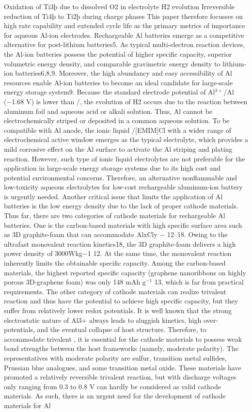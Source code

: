 Oxidation of Ti3þ due to dissolved O2 in electrolyte
H2 evolution
Irreversible reduction of Ti4þ to Ti2þ during charge phases 
This paper therefore focusses on high rate capability and extended cycle life as the primary metrics of importance for aqueous Al-ion electrodes.
Rechargeable Al batteries emerge as a competitive alternative for post-lithium batteries5. As typical multi-electron reaction devices, the Al-ion batteries possess the potential of higher specific capacity, superior volumetric energy density, and comparable gravimetric energy density to lithium-ion batteries6,8,9. Moreover, the high abundancy and easy accessibility of Al resources enable Al-ion batteries to become an ideal candidate for large-scale energy storage system9. Because the standard electrode potential of Al$^{3+}$/Al (−1.68 V) is lower than /, the evolution of H2 occurs due to the reaction between aluminum foil and aqueous acid or alkali solution. Thus, Al cannot be electrochemically striped or deposited
in a common aqueous solution. To be compatible with Al anode, the ionic liquid /[EMIM]Cl with a wider range of electrochemical active window emerges as the typical electrolyte, which provides a mild corrosive effect on the Al surface to activate the Al striping and plating reaction. However, such type of ionic liquid electrolytes are not preferable for the application in large-scale energy storage systems due to its high cost and potential environmental concerns. Therefore, an alternative nonflammable and low-toxicity aqueous electrolytes for low-cost rechargeable aluminum-ion battery is urgently needed. Another critical issue that limits the application of Al batteries is the low energy density due to the lack of proper cathode materials. Thus far, there are two categories of cathode materials for rechargeable Al batteries. One is the carbon-based materials with high specific surface area such as 3D graphite-foam that can accommodate AlxCly − 12–18. Owing to the ultrafast monovalent reaction kinetics18, the 3D graphite-foam delivers a high power density of 3000Wkg−1 12. At the same time, the monovalent reaction inherently limits the obtainable specific capacity. Among the carbon-based materials, the highest reported specific capacity (graphene nanoribbons on highly porous 3D-graphene foam) was only 148 mAh g$^{−1}$ 13, which is far from practical requirements. The other category of cathode materials can realize trivalent reaction and thus have the potential to achieve high specific capacity, but they suffer from relatively lower redox potentials. It is well known that the strong electrostatic nature of Al3+ always leads to sluggish kinetics, high over-potentials, and the eventual collapse of host structure. Therefore, to accommodate trivalent , it is essential for the cathode materials to possess weak bond strengths between the host frameworks (namely, moderate polarity). The representatives with moderate polarity are sulfur, transition metal sulfides, Prussian blue analogues, and some transition metal oxide. These materials have promoted a relatively reversible trivalent reaction, but with discharge voltages only ranging from 0.3 to 0.8 V can hardly be considered as valid cathode materials. As such, there is an urgent need for the development of cathode materials for Al
